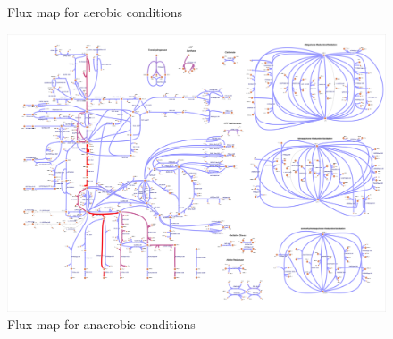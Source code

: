\documentclass{scrartcl}
\begin{document}
\begin{enumerate}
\begin{figure}[H]
	\caption{Flux map for aerobic conditions}
	\label{fig:aerobic}
\end{figure}
\begin{figure}[H]
	\centering
	\includegraphics[max width=\linewidth]{src/2_b.pdf}
	\caption{Flux map for anaerobic conditions}
	\label{fig:anaerobic}
\end{figure}
\end{enumerate}
\end{document}
